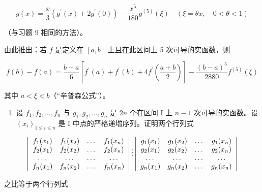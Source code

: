 \[
g (x) = \frac {x}{3} \left(g ^ {\prime} (x) + 2 g ^ {\prime} (0)\right) - \frac {x ^ {5}}{1 8 0} g ^ {(5)} (\xi) \quad (\xi = \theta x, \quad 0 <   \theta <   1)
\]

（与习题 9 相同的方法）。

由此推出：若 \(f\) 是定义在 \([a, b]\) 上且在此区间上 5 次可导的实函数，则

\[
f (b) - f (a) = \frac {b - a}{6} \left[ f ^ {\prime} (a) + f ^ {\prime} (b) + 4 f ^ {\prime} \left(\frac {a + b}{2}\right) \right] - \frac {(b - a) ^ {5}}{2 8 8 0} f ^ {(5)} (\xi)
\]

其中 \(a < \xi < b\)（“辛普森公式”）。

\begin{enumerate}
\def\labelenumi{\arabic{enumi})}
\setcounter{enumi}{10}
\tightlist
\item
  设 \(f_{1}, f_{2}, \ldots, f_{n}\) 与 \(g_{1}, g_{2}, \ldots, g_{n}\) 是 \(2n\) 个在区间 I 上 \(n - 1\) 次可导的实函数。设 \((x_{i})_{1 \leqslant i \leqslant n}\) 是 I 中点的严格递增序列。证明两个行列式
\end{enumerate}

\[
\left| \begin{array}{c c c c} f _ {1} (x _ {1}) & f _ {1} (x _ {2}) & \dots & f _ {1} (x _ {n}) \\ f _ {2} (x _ {1}) & f _ {2} (x _ {2}) & \dots & f _ {2} (x _ {n}) \\ \dots & \dots & \dots & \dots \\ f _ {n} (x _ {1}) & f _ {n} (x _ {2}) & \dots & f _ {n} (x _ {n}) \end{array} \right| \vdots \left| \begin{array}{c c c c} g _ {1} (x _ {1}) & g _ {1} (x _ {2}) & \dots & g _ {1} (x _ {n}) \\ g _ {2} (x _ {1}) & g _ {2} (x _ {2}) & \dots & g _ {2} (x _ {n}) \\ \dots & \dots & \dots & \dots \\ g _ {n} (x _ {1}) & g _ {n} (x _ {2}) & \dots & g _ {n} (x _ {n}) \end{array} \right|
\]

之比等于两个行列式

